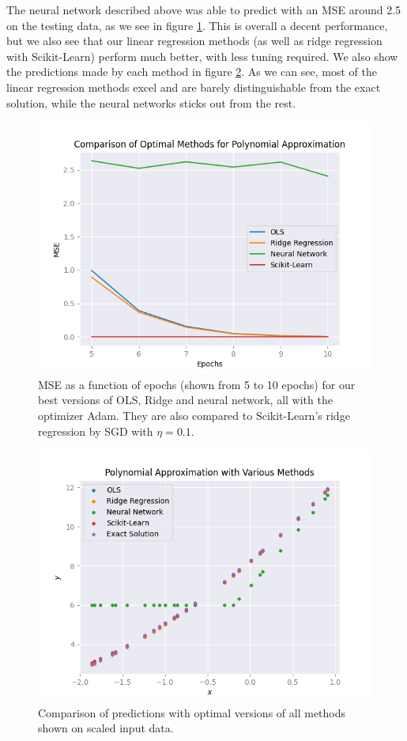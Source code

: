 The neural network described above was able to predict with an MSE around 2.5 on the testing data, as we see in figure \ref{fig:numericalprediction}. This is overall a decent performance, but we also see that our linear regression methods (as well as ridge regression with Scikit-Learn) perform much better, with less tuning required. We also show the predictions made by each method in figure \ref{fig:predictioncomparison}. As we can see, most of the linear regression methods excel and are barely distinguishable from the exact solution, while the neural networks sticks out from the rest. 
\begin{figure}
    \centering
    \includegraphics[width=\linewidth]{figures/all_plots/numericalprediction.png}
    \caption{MSE as a function of epochs (shown from 5 to 10 epochs) for our best versions of OLS, Ridge and neural network, all with the optimizer Adam. They are also compared to Scikit-Learn's ridge regression by SGD with $\eta = 0.1$.}
    \label{fig:numericalprediction}
\end{figure}

\begin{figure}
    \centering
    \includegraphics[width=\linewidth]{figures/all_plots/predictioncomparison.png}
    \caption{Comparison of predictions with optimal versions of all methods shown on scaled input data.}
    \label{fig:predictioncomparison}
\end{figure}
\clearpage
